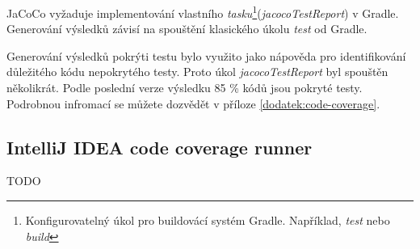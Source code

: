     JaCoCo vyžaduje implementování vlastního \textit{tasku}\footnote{Konfigurovatelný úkol pro buildovácí systém Gradle. Například, \textit{test} nebo \textit{build}}(\textit{jacocoTestReport}) v Gradle. Generování výsledků závisí na spouštění klasického úkolu \textit{test} od Gradle. 
    
    Generování výsledků pokrýti testu bylo využito jako nápověda pro identifikování důležitého kódu nepokrytého testy. Proto úkol \textit{jacocoTestReport} byl spouštěn několikrát. Podle poslední verze výsledku 85 \% kódů jsou pokryté testy. Podrobnou infromací se můžete dozvědět v příloze \ref{dodatek:code-coverage}.
    \subsection{IntelliJ IDEA code coverage runner}
    TODO